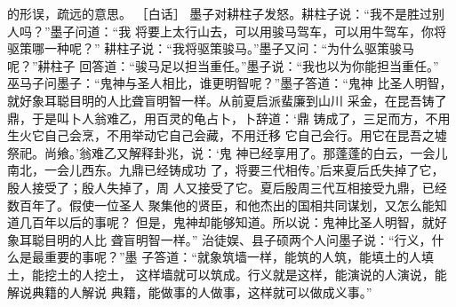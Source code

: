 \documentclass[12pt,UTF8]{ctexbook}
\begin{document}
的形误，疏远的意思。 
［白话］ 
墨子对耕柱子发怒。耕柱子说：“我不是胜过别人吗？”墨子问道：“我 
将要上太行山去，可以用骏马驾车，可以用牛驾车，你将驱策哪一种呢？” 
耕柱子说：“我将驱策骏马。”墨子又问：“为什么驱策骏马呢？”耕柱子 
回答道：“骏马足以担当重任。”墨子说：“我也以为你能担当重任。” 
巫马子问墨子：“鬼神与圣人相比，谁更明智呢？”墨子答道：“鬼神 
比圣人明智，就好象耳聪目明的人比聋盲明智一样。从前夏启派蜚廉到山川 
采金，在昆吾铸了鼎，于是叫卜人翁难乙，用百灵的龟占卜，卜辞道：‘鼎 
铸成了，三足而方，不用生火它自己会烹，不用举动它自己会藏，不用迁移 
它自己会行。用它在昆吾之墟祭祀。尚飨。’翁难乙又解释卦兆，说：‘鬼 
神已经享用了。那蓬蓬的白云，一会儿南北，一会儿西东。九鼎已经铸成功 
了，将要三代相传。’后来夏后氏失掉了它，殷人接受了；殷人失掉了，周 
人又接受了它。夏后殷周三代互相接受九鼎，已经数百年了。假使一位圣人 
聚集他的贤臣，和他杰出的国相共同谋划，又怎么能知道几百年以后的事呢？ 
但是，鬼神却能够知道。所以说：鬼神比圣人明智，就好象耳聪目明的人比 
聋盲明智一样。” 
治徒娱、县子硕两个人问墨子说：“行义，什么是最重要的事呢？”墨 
子答道：“就象筑墙一样，能筑的人筑，能填土的人填土，能挖土的人挖土， 
这样墙就可以筑成。行义就是这样，能演说的人演说，能解说典籍的人解说 
典籍，能做事的人做事，这样就可以做成义事。” 
\end{document}
